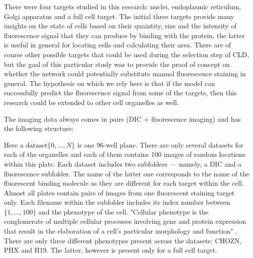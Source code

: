 There were four targets studied in this research: nuclei, endoplasmic reticulum, Golgi apparatus and a full cell target. The initial three targets provide many insights on the state of cells based on their quaintity, size and the intensity of fluorescence signal that they can produce by binding with the protein, the latter is useful in general for locating cells and calculating their area. There are of course other possible targets that could be used during the selection step of CLD, but the goal of this particular study was to provide the proof of concept on whether the network could potentially substitute manual fluorescence staining in general. The hypothesis on which we rely here is that if the model can successfully predict the fluorescence signal from some of the targets, then this research could be extended to other cell organelles as well.

The imaging data always comes in pairs (DIC + fluorescence imaging) and has the following structure:



Here a $\text{dataset}\{0, \ldots, N\}$ is one 96-well plane. There are only several datasets for each of the organelles and each of them contains 100 images of random locations within this plate. Each dataset includes two subfolders --- namely, a DIC and a fluorescence subfolder. The name of the latter one corresponds to the name of the fluorescent binding molecule as they are different for each target within the cell. Almost all plates contain pairs of images from one fluorescent staining target only. Each filename within the subfolder includes its index number between $\{1, \ldots, 100\}$ and the phenotype of the cell. "Cellular phenotype is the conglomerate of multiple cellular processes involving gene and protein expression that result in the elaboration of a cell's particular morphology and function" \cite{Sul_2009}. There are only three different phenotypes present across the datasets: CHOZN, PHX and H19. The latter, however is present only for a full cell target.

